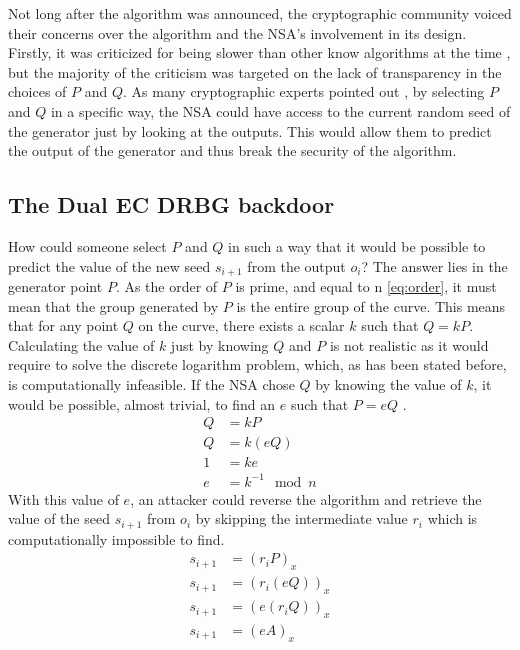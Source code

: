 Not long after the algorithm was announced, the cryptographic community voiced their concerns over the algorithm and the NSA's involvement in its design. Firstly, it was criticized for being slower than other know algorithms at the time \cite{green-2013-dualec-flaws}, but the majority of the criticism was targeted on the lack of transparency in the choices of $P$ and $Q$. As many cryptographic experts pointed out \cite{comments-on-dual-ec-drbg} \cite{ecdsa}, by selecting $P$ and $Q$ in a specific way, the NSA could have access to the current random seed of the generator just by looking at the outputs. This would allow them to predict the output of the generator and thus break the security of the algorithm.

\subsection{The Dual EC DRBG backdoor}
How could someone select $P$ and $Q$ in such a way that it would be possible to predict the value of the new seed $s_{i + 1}$ from the output $o_i$? The answer lies in the generator point $P$. As the order of $P$ is prime, and equal to n \eqref{eq:order}, it must mean that the group generated by $P$ is the entire group of the curve. This means that for any point $Q$ on the curve, there exists a scalar $k$ such that $Q = kP$. Calculating the value of $k$ just by knowing $Q$ and $P$ is not realistic as it would require to solve the discrete logarithm problem, which, as has been stated before, is computationally infeasible. If the NSA chose $Q$ by knowing the value of $k$, it would be possible, almost trivial, to find an $e$ such that $P = eQ$ \cite{backdoor}.
\begin{align}
    Q &= kP \nonumber \\
    Q &= k(eQ) \nonumber \\
    1 &= ke \nonumber \\
    e &= k^{-1} \mod n
\end{align}
With this value of $e$, an attacker could reverse the algorithm and retrieve the value of the seed $s_{i + 1}$ from $o_i$ by skipping the intermediate value $r_i$ which is computationally impossible to find.
\begin{align}
    s_{i + 1} &= {(r_iP)}_x \nonumber \\
    s_{i + 1} &= {(r_i(eQ))}_x \nonumber \\
    s_{i + 1} &= {(e(r_iQ))}_x \nonumber \\
    s_{i + 1} &= {(eA)}_x 
\end{align}

